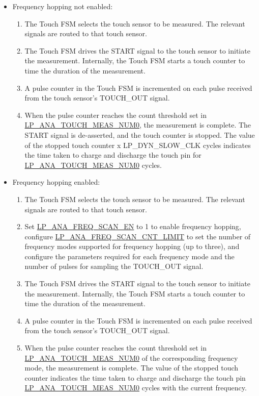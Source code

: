 \documentclass[main\_\_EN.tex]{subfiles}
\begin{document}
\begin{itemize}
    \item Frequency hopping not enabled:
        \begin{enumerate}
            \item The Touch FSM selects the touch sensor to be measured. The relevant signals are routed to that touch sensor.
            \item The Touch FSM drives the START signal to the touch sensor to initiate the measurement. Internally, the Touch FSM starts a touch counter to time the duration of the measurement.
            \item A pulse counter in the Touch FSM is incremented on each pulse received from the touch sensor's TOUCH\_OUT signal.
            \item When the pulse counter reaches the count threshold set in \hyperref[fielddesc:LPANATOUCHMEASNUM0]{LP\_ANA\_TOUCH\_MEAS\_NUM0}, the measurement is complete. The START signal is de-asserted, and the touch counter is stopped. The value of the stopped touch counter x LP\_DYN\_SLOW\_CLK cycles indicates the time taken to charge and discharge the touch pin for \hyperref[fielddesc:LPANATOUCHMEASNUM0]{LP\_ANA\_TOUCH\_MEAS\_NUM0} cycles.
        \end{enumerate}
    \item Frequency hopping enabled:
        \begin{enumerate}
            \item The Touch FSM selects the touch sensor to be measured. The relevant signals are routed to that touch sensor.
            \item Set \hyperref[fielddesc:LPANAFREQSCANEN]{LP\_ANA\_FREQ\_SCAN\_EN} to 1 to enable frequency hopping, configure \hyperref[fielddesc:LPANAFREQSCANCNTLIMIT]{LP\_ANA\_FREQ\_SCAN\_CNT\_LIMIT} to set the number of frequency modes supported for frequency hopping (up to three), and configure the parameters required for each frequency mode and the number of pulses for sampling the TOUCH\_OUT signal.
            \item The Touch FSM drives the START signal to the touch sensor to initiate the measurement. Internally, the Touch FSM starts a touch counter to time the duration of the measurement.
            \item A pulse counter in the Touch FSM is incremented on each pulse received from the touch sensor's TOUCH\_OUT signal.
            \item When the pulse counter reaches the count threshold set in \hyperref[fielddesc:LPANATOUCHMEASNUM0]{LP\_ANA\_TOUCH\_MEAS\_NUM0} of the corresponding frequency mode, the measurement is complete. The value of the stopped touch counter indicates the time taken to charge and discharge the touch pin \hyperref[fielddesc:LPANATOUCHMEASNUM0]{LP\_ANA\_TOUCH\_MEAS\_NUM0} cycles with the current frequency.

\end{enumerate}
\end{itemize}
\end{document}
